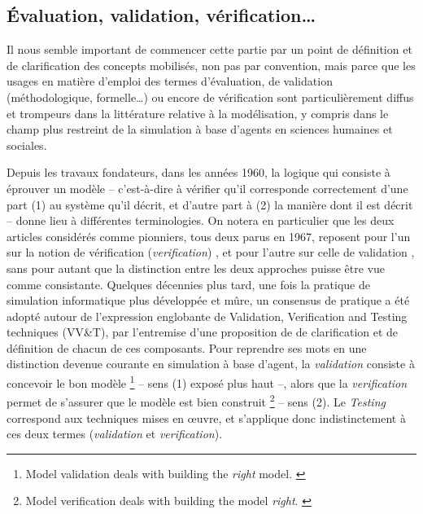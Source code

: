 \subsection{Évaluation, validation, vérification\ldots}

Il nous semble important de commencer cette partie par un point de définition et de clarification des concepts mobilisés, non pas par convention, mais parce que les usages en matière d'emploi des termes d'évaluation, de validation (méthodologique, formelle\ldots) ou encore de vérification sont particulièrement diffus et trompeurs dans la littérature relative à la modélisation, y compris dans le champ plus restreint de la simulation à base d'agents en sciences humaines et sociales.

Depuis les travaux fondateurs, dans les années 1960, la logique qui consiste à éprouver un modèle -- c'est-à-dire à vérifier qu'il corresponde correctement d'une part (1) au système qu'il décrit, et d'autre part à
(2) la manière dont il est décrit -- donne lieu à différentes terminologies.
On notera en particulier que les deux articles considérés comme pionniers, tous deux parus en 1967, reposent pour l'un sur la notion de vérification (\textit{verification}) \autocite{naylor_verification_1967}, et pour l'autre sur celle de validation \autocite{hermann_validation_1967}, sans pour autant que la distinction entre les deux approches puisse être vue comme consistante.
Quelques décennies plus tard, une fois la pratique de simulation informatique plus développée et mûre, un consensus de pratique a été adopté autour de l'expression englobante de \og Validation, Verification and Testing techniques (VV\&T)\fg{}, par l'entremise d'une proposition de \textcite{balci_validation_1994} de clarification et de définition de chacun de ces composants.
Pour reprendre ses mots en une distinction devenue courante en simulation à base d'agent, la \textit{validation} consiste à concevoir le bon modèle 
\footnote{
	\og Model validation deals with building the \textit{right} model.\fg{} \autocite[121]{balci_validation_1994}
} -- sens (1) exposé plus haut --,
alors que la \textit{verification} permet de s'assurer que le modèle est bien construit
\footnote{
	\og Model verification deals with building the model \textit{right}.\fg{} \autocite[123]{balci_validation_1994}
} -- sens (2).
Le \og \textit{Testing}\fg{} correspond aux techniques mises en œuvre, et s'applique donc indistinctement à ces deux termes (\textit{validation} et \textit{verification}).


